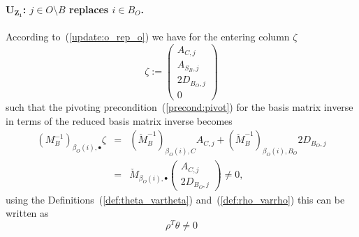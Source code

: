 \documentclass[a4paper]{article}
\begin{document}
\paragraph{$\mathbf{U_{Z_{1}}}$: $j \in O \setminus B$ replaces $i \in B_{O}$.}
According to~(\ref{update:o_rep_o}) we have for the entering column $\zeta$
\begin{equation}
\zeta:=
\left(
\begin{array}{c}
A_{C, j} \\
\hline
A_{S_{B},j} \\
\hline
2D_{B_{O}, j} \\
\hline
0
\end{array}
\right)
\end{equation}
such that the pivoting precondition~(\ref{precond:pivot})
for the basis matrix inverse in terms of
the reduced basis matrix inverse becomes
\begin{eqnarray}
\left(M_{B}^{-1}\right)_{\beta_{O}(i), \bullet} \zeta
&=&
\left(\check{M}_{B}^{-1}\right)_{\beta_{O}(i),C}A_{C,j}
+\left(\check{M}_{B}^{-1}\right)_{\beta_{O}(i), B_{O}}2D_{B_{O},j}
\nonumber \\
&=&
\check{M}_{\beta_{O}(i), \bullet}
\left(
\begin{array}{c}
A_{C,j} \\
\hline
2D_{B_{O},j}
\end{array}
\right)
\neq 0,
\nonumber
\end{eqnarray}
using the Definitions~(\ref{def:theta_vartheta})
and~(\ref{def:rho_varrho}) this can be written as
\begin{equation}
\rho^{T}\theta \neq 0
\end{equation}
\end{document}

